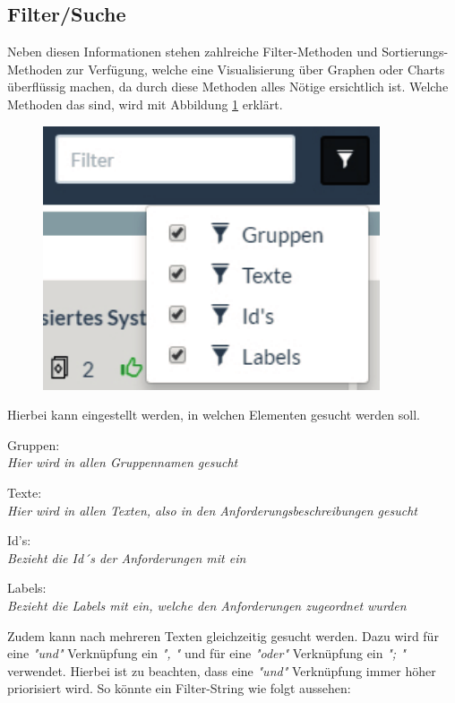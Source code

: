 \subsection{Filter/Suche}
Neben diesen Informationen stehen zahlreiche Filter-Methoden und Sortierungs-Methoden zur Verfügung, welche eine Visualisierung über Graphen oder Charts überflüssig machen, da durch diese Methoden alles Nötige ersichtlich ist. Welche Methoden das sind, wird mit Abbildung \ref{fig:header} erklärt.  

\begin{figure}[!htb]
		\includegraphics[width=.5\textwidth]{images/filter.pdf}
\centering 
{} 
\label{fig:header}
\end{figure}

Hierbei kann eingestellt werden, in welchen Elementen gesucht werden soll.
\begin{description}
\item Gruppen:\\
\textit{Hier wird in allen Gruppennamen gesucht}
\item Texte:\\
\textit{Hier wird in allen Texten, also in den Anforderungsbeschreibungen gesucht}
\item Id's:\\
\textit{Bezieht die Id´s der Anforderungen mit ein}
\item Labels:\\
\textit{Bezieht die Labels mit ein, welche den Anforderungen zugeordnet wurden}
\end{description}

Zudem kann nach mehreren Texten gleichzeitig gesucht werden. Dazu wird für eine \textit{"und"} Verknüpfung ein \textit{", "} und für eine \textit{"oder"} Verknüpfung ein \textit{"; "} verwendet. Hierbei ist zu beachten, dass eine \textit{"und"} Verknüpfung immer höher priorisiert wird. So könnte ein Filter-String wie folgt aussehen:

